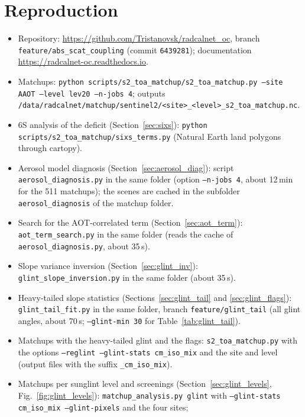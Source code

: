 \documentclass[11pt,a4paper]{article}
\newcommand{\code}[1]{\texttt{#1}}
\begin{document}
\appendix
\section{Reproduction}
\begin{itemize}
\item Repository: \url{https://github.com/Tristanovsk/radcalnet_oc}, branch \code{feature/abs\_scat\_coupling}
  (commit \code{6439281}); documentation \url{https://radcalnet-oc.readthedocs.io}.
\item Matchups: \code{python scripts/s2\_toa\_matchup/s2\_toa\_matchup.py --site AAOT --level lev20 --n-jobs 4};
  outputs \code{/data/radcalnet/matchup/sentinel2/<site>\_<level>\_s2\_toa\_matchup.nc}.
\item 6S analysis of the deficit (Section~\ref{sec:sixs}): \code{python scripts/s2\_toa\_matchup/sixs\_terms.py}
  (Natural Earth land polygons through cartopy).
\item Aerosol model diagnosis (Section~\ref{sec:aerosol_diag}): script \code{aerosol\_diagnosis.py} in the
  same folder (option \code{--n-jobs 4}, about 12\,min for the 511 matchups); the scenes are cached in the
  subfolder \code{aerosol\_diagnosis} of the matchup folder.
\item Search for the AOT-correlated term (Section~\ref{sec:aot_term}): \code{aot\_term\_search.py} in the same
  folder (reads the cache of \code{aerosol\_diagnosis.py}, about 35\,s).
\item Slope variance inversion (Section~\ref{sec:glint_inv}): \code{glint\_slope\_inversion.py} in the same folder
  (about 35\,s).
\item Heavy-tailed slope statistics (Sections~\ref{sec:glint_tail} and \ref{sec:glint_flags}):
  \code{glint\_tail\_fit.py} in the same folder, branch \code{feature/glint\_tail} (all glint angles, about 70\,s;
  \code{--glint-min 30} for Table~\ref{tab:glint_tail}).
\item Matchups with the heavy-tailed glint and the flags: \code{s2\_toa\_matchup.py} with the options
  \code{--reglint --glint-stats cm\_iso\_mix} and the site and level (output files with the suffix
  \code{\_cm\_iso\_mix}).
\item Matchups per sunglint level and screenings (Section~\ref{sec:glint_levels}, Fig.~\ref{fig:glint_levels}):
  \code{matchup\_analysis.py glint} with \code{--glint-stats cm\_iso\_mix --glint-pixels} and the four sites;

\end{itemize}
\end{document}
